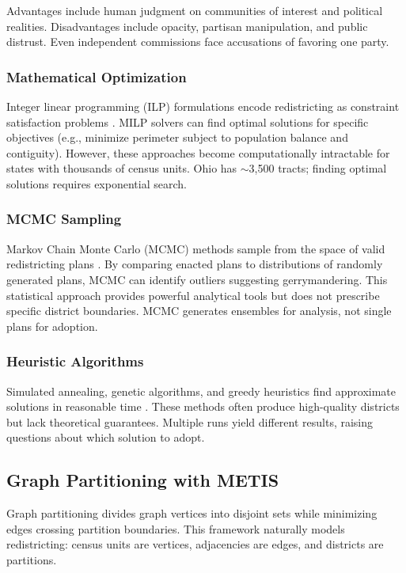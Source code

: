 Advantages include human judgment on communities of interest and political realities. Disadvantages include opacity, partisan manipulation, and public distrust. Even independent commissions face accusations of favoring one party.

\subsubsection{Mathematical Optimization}

Integer linear programming (ILP) formulations encode redistricting as constraint satisfaction problems \cite{garfinkel1970optimal,hess1965nonpartisan}. MILP solvers can find optimal solutions for specific objectives (e.g., minimize perimeter subject to population balance and contiguity). However, these approaches become computationally intractable for states with thousands of census units. Ohio has $\sim$3,500 tracts; finding optimal solutions requires exponential search.

\subsubsection{MCMC Sampling}

Markov Chain Monte Carlo (MCMC) methods sample from the space of valid redistricting plans \cite{duchin2018outlier,fifield2015new}. By comparing enacted plans to distributions of randomly generated plans, MCMC can identify outliers suggesting gerrymandering. This statistical approach provides powerful analytical tools but does not prescribe specific district boundaries. MCMC generates ensembles for analysis, not single plans for adoption.

\subsubsection{Heuristic Algorithms}

Simulated annealing, genetic algorithms, and greedy heuristics find approximate solutions in reasonable time \cite{bozkaya2003tabu,altman1997districting}. These methods often produce high-quality districts but lack theoretical guarantees. Multiple runs yield different results, raising questions about which solution to adopt.

\subsection{Graph Partitioning with METIS}

Graph partitioning divides graph vertices into disjoint sets while minimizing edges crossing partition boundaries. This framework naturally models redistricting: census units are vertices, adjacencies are edges, and districts are partitions.

